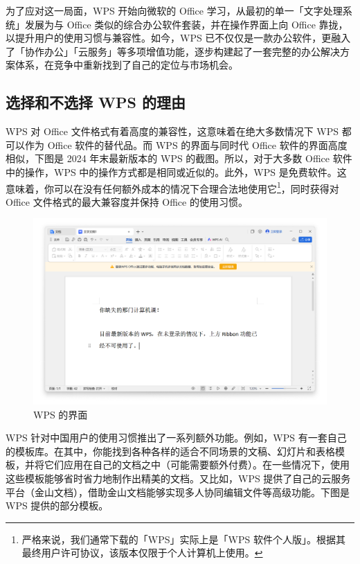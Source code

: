 为了应对这一局面，WPS 开始向微软的 Office 学习，从最初的单一「文字处理系统」发展为与 Office 类似的综合办公软件套装，并在操作界面上向 Office 靠拢，以提升用户的使用习惯与兼容性。如今，WPS 已不仅仅是一款办公软件，更融入了「协作办公」「云服务」等多项增值功能，逐步构建起了一套完整的办公解决方案体系，在竞争中重新找到了自己的定位与市场机会。

\subsection{选择和不选择 WPS 的理由}

WPS 对 Office 文件格式有着高度的兼容性，这意味着在绝大多数情况下 WPS 都可以作为 Office 软件的替代品。而 WPS 的界面与同时代 Office 软件的界面高度相似，下图是 2024 年末最新版本的 WPS 的截图。所以，对于大多数 Office 软件中的操作，WPS 中的操作方式都是相同或近似的。此外，WPS 是免费软件。这意味着，你可以在没有任何额外成本的情况下合理合法地使用它\footnote{严格来说，我们通常下载的「WPS」实际上是「WPS 软件个人版」。根据其最终用户许可协议，该版本仅限于个人计算机上使用。}，同时获得对 Office 文件格式的最大兼容度并保持 Office 的使用习惯。

\begin{figure}[htb!]
  \centering
  \includegraphics[width=.8\textwidth]{assets/software/WPS_Office.png}
  \caption{WPS 的界面}
  \label{fig:WPS_Office}
\end{figure}

WPS 针对中国用户的使用习惯推出了一系列额外功能。例如，WPS 有一套自己的模板库。在其中，你能找到各种各样的适合不同场景的文稿、幻灯片和表格模板，并将它们应用在自己的文档之中（可能需要额外付费）。在一些情况下，使用这些模板能够省时省力地制作出精美的文档。又比如，WPS 提供了自己的云服务平台（金山文档），借助金山文档能够实现多人协同编辑文件等高级功能。下图是 WPS 提供的部分模板。

